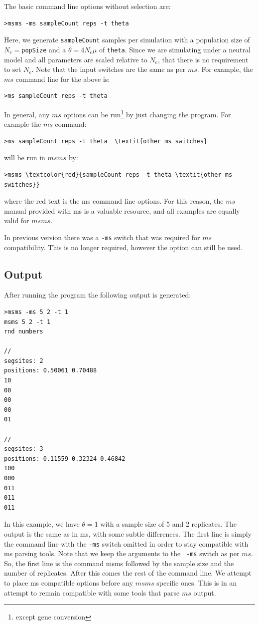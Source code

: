 \documentclass{article}
\begin{document}
The basic command line options without selection are:
\begin{verbatim}
>msms -ms sampleCount reps -t theta 
\end{verbatim}
Here, we generate {\tt sampleCount} samples per simulation with a population size
of $N_e=${\tt popSize} and a $\theta=4N_e\mu$ of {\tt theta}. Since we are
simulating under a neutral model and all parameters are scaled relative to $N_e$,
that there is no requirement to set $N_e$. Note that the input
switches are the same as per $ms$. For example, the $ms$ command line for the
above is:
\begin{verbatim}
>ms sampleCount reps -t theta  
\end{verbatim}
In general, any $ms$ options can be run\footnote{except gene conversion} by
just changing the program.
For example the $ms$ command: 
\begin{Verbatim}[commandchars=\\\{\}]
>ms sampleCount reps -t theta  \textit{other ms switches}
\end{Verbatim}
will be run in $msms$ by:
\begin{Verbatim}[commandchars=\\\{\}]
>msms \textcolor{red}{sampleCount reps -t theta \textit{other ms switches}}
\end{Verbatim}
where the red text is the ms command line options. For this reason, the $ms$
manual provided with ms is a valuable resource, and all  examples are equally
valid for $msms$.

In previous version there was a {\tt -ms} switch that was required for $ms$
compatibility. This is no longer required, however the option can still be used. 

\subsection{Output}

After running the program the following output is generated:
\begin{verbatim}
>msms -ms 5 2 -t 1
msms 5 2 -t 1 
rnd numbers

//
segsites: 2
positions: 0.50061 0.70488
10
00
00
00
01

// 
segsites: 3 
positions: 0.11559 0.32324 0.46842
100 
000 
011 
011 
011
\end{verbatim}
In this example, we have $\theta=1$ with a sample size of 5  and 2 replicates.
The output is the same as in ms, with some subtle differences. The first line is
simply the command line with the {\tt -ms} switch omitted in order to stay
compatible with ms parsing tools. Note that we keep the arguments to the {\tt
-ms} switch as per $ms$. So, the first line is the command msms followed by the
sample size and the number of replicates. After this comes the rest of the
command line. We attempt to place ms compatible options before any $msms$
specific ones. This is in an attempt to remain compatible with some tools that
parse $ms$ output.
\end{document}
